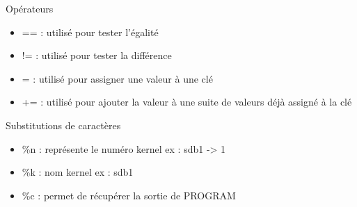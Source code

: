 \documentclass{beamer}
\begin{document}
\begin{frame}
\begin{block}{Opérateurs} 
	
	\begin{itemize}
		
		[circle]
		\item == : utilisé pour tester l'égalité
		\item != : utilisé pour tester la différence
		\item = : utilisé pour assigner une valeur à une clé
		\item += : utilisé pour ajouter la valeur à une suite de valeurs déjà assigné à la clé
	\end{itemize}
\end{block}

\begin{block}{Substitutions de caractères} 
	
	\begin{itemize}
		
		[circle]
		\item \%n : représente le numéro kernel ex : sdb1 -> 1
		\item \%k : nom kernel ex : sdb1 
		\item \%c : permet de récupérer la sortie de PROGRAM
	\end{itemize}
\end{block}

\end{frame}
\end{document}
